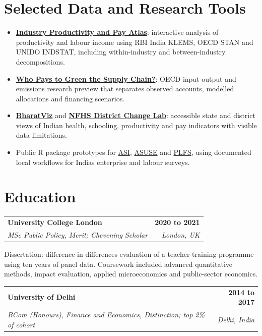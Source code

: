 \documentclass[10pt,a4paper]{article}
\makeatletter
\newcommand{\entry}[4]{%
  \begin{tabularx}{\textwidth}{@{}X r@{}}
    \textbf{#1} & \textbf{#2} \\
    \textit{#3} & \textit{#4}
  \end{tabularx}\vspace{-2pt}
}
\newcommand{\link}[2]{\href{#1}{\color{teal}#2}}
\makeatother
\begin{document}
\section*{Selected Data and Research Tools}
\begin{itemize}
  \item \textbf{\link{https://rahulsh97.github.io/industry-productivity-pay-atlas/}{Industry Productivity and Pay Atlas}}: interactive analysis of productivity and labour income using RBI India KLEMS, OECD STAN and UNIDO INDSTAT, including within-industry and between-industry decompositions.
  \item \textbf{\link{https://rahulsh97.github.io/green-supplier-finance-lab/}{Who Pays to Green the Supply Chain?}}: OECD input-output and emissions research preview that separates observed accounts, modelled allocations and financing scenarios.
  \item \textbf{\link{https://rahulshukla.shinyapps.io/d3poindia/}{BharatViz}} and \textbf{\link{https://rahulsh97.github.io/nfhs-lab/}{NFHS District Change Lab}}: accessible state and district views of Indian health, schooling, productivity and pay indicators with visible data limitations.
  \item Public R package prototypes for \link{https://github.com/rahulsh97/asi}{ASI}, \link{https://github.com/rahulsh97/asuse}{ASUSE} and \link{https://github.com/rahulsh97/plfs}{PLFS}, using documented local workflows for India\textquotesingle s enterprise and labour surveys.
\end{itemize}

\section*{Education}
\entry{University College London}{2020 to 2021}{MSc Public Policy, Merit; Chevening Scholar}{London, UK}
{\small Dissertation: difference-in-differences evaluation of a teacher-training programme using ten years of panel data. Coursework included advanced quantitative methods, impact evaluation, applied microeconomics and public-sector economics.}

\vspace{4pt}
\entry{University of Delhi}{2014 to 2017}{BCom (Honours), Finance and Economics, Distinction; top 2\% of cohort}{Delhi, India}
\end{document}
